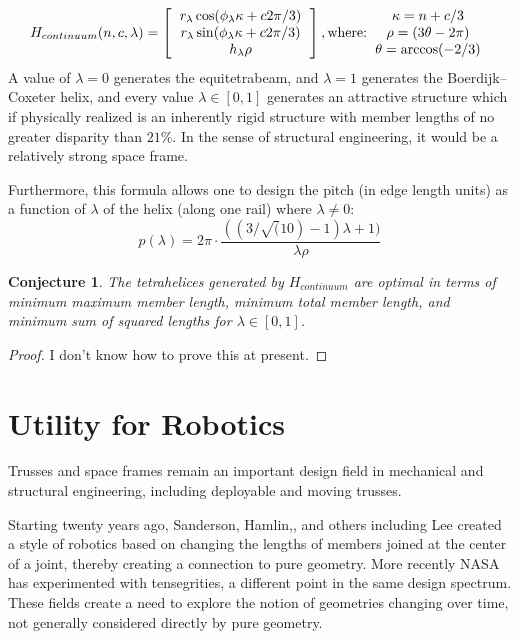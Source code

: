 \documentclass[11pt]{article}
\newtheorem{conjecture}{Conjecture}
\begin{document}
\[
H_{continuum}(n,c,\lambda) =
\left [
  \begin{tabular}{c}
   $ r_{\lambda} \cos(\phi_{\lambda} \kappa + c 2 \pi /3) $\\
   $ r_{\lambda}  \sin(\phi_{\lambda} \kappa + c 2 \pi /3) $\\
   $ h_{\lambda} \rho $
  \end{tabular}
  \right ],
\text{where:}
  \begin{tabular}{c}
 $\kappa = n + c/3$ \\
    $\rho = (3 \theta - 2 \pi)$ \\
   $ \theta = \arccos(-2/3) $
  \end{tabular}      
\]
A value of $\lambda = 0$ generates the equitetrabeam, and $\lambda = 1$ generates the Boerdijk--Coxeter helix, and every
value $\lambda \in [0,1]$ generates an attractive structure which if physically realized is an inherently rigid structure
with member lengths of no greater disparity than $21\%$.
In the sense of structural engineering, it would be a relatively strong space frame.

Furthermore, this formula allows one to design the pitch (in edge length units) as a function of $\lambda$ of the helix (along one rail)
where $\lambda \neq 0$:
\[
p(\lambda) = 2 \pi  \cdot \frac{((3/\sqrt(10) -1) \lambda +1)}{ \lambda  \rho }
\]

\begin{conjecture}
  The tetrahelices generated by $H_{continuum}$ are optimal in terms of minimum maximum member length, minimum total member length, and minimum
  sum of squared lengths for $\lambda \in [0,1]$.
\end{conjecture}

\begin{proof}
I don't know how to prove this at present.
\end{proof}

\section{Utility for Robotics}

Trusses and space frames remain an important design field in mechanical and structural engineering\cite{mikulas1985sequentially},
including deployable and moving trusses\cite{claypool2012readily}.

Starting twenty years ago, Sanderson\cite{sanderson1996modular}, Hamlin,\cite{TetrobotBook}, and others including Lee\cite{lee2002dynamic}
created a style of robotics based on changing the lengths of members
joined at the center of a joint, thereby creating a connection to pure geometry. More recently NASA has experimented with
tensegrities\cite{NTRT}, a different point in the same design spectrum. These fields create a need to explore the notion of
geometries changing over time, not generally considered directly by pure geometry.
\end{document}
